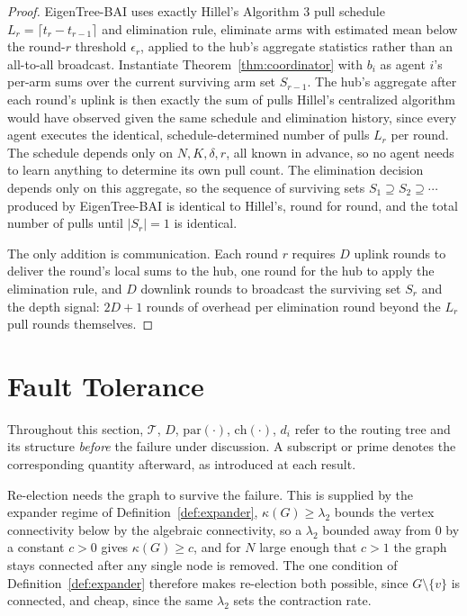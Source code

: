 \documentclass[letterpaper]{article} %
\begin{document}
\begin{proof}
EigenTree-BAI uses exactly Hillel's Algorithm 3 pull schedule $L_r = \lceil t_r
- t_{r-1}\rceil$ and elimination rule, eliminate arms with estimated mean
below the round-$r$ threshold $\epsilon_r$, applied to the hub's aggregate
statistics rather than an all-to-all broadcast. Instantiate
Theorem~\ref{thm:coordinator} with $b_i$ as agent $i$'s per-arm sums over
the current surviving arm set $S_{r-1}$. The hub's aggregate after each
round's uplink is then exactly the sum of pulls Hillel's centralized
algorithm would have observed given the same schedule and elimination
history, since every agent executes the identical, schedule-determined
number of pulls $L_r$ per round. The schedule depends only on
$N,K,\delta,r$, all known in advance, so no agent needs to learn anything
to determine its own pull count. The elimination decision depends only on
this aggregate, so the sequence of surviving sets $S_1 \supseteq S_2
\supseteq \cdots$ produced by EigenTree-BAI is identical to Hillel's, round for
round, and the total number of pulls until $|S_r|=1$ is identical.

The only addition is communication. Each round $r$ requires $D$ uplink
rounds to deliver the round's local sums to the hub, one round for the hub
to apply the elimination rule, and $D$ downlink rounds to broadcast the
surviving set $S_r$ and the depth signal: $2D+1$ rounds of overhead per
elimination round beyond the $L_r$ pull rounds themselves.
\end{proof}

\section{Fault Tolerance}
\label{sec:ft}

Throughout this section, $\mathcal{T}$, $D$, $\mathrm{par}(\cdot)$,
$\mathrm{ch}(\cdot)$, $d_i$ refer to the routing tree and its structure
\emph{before} the failure under discussion. A subscript or prime denotes
the corresponding quantity afterward, as introduced at each result.

Re-election needs the graph to survive the failure. This is supplied by the
expander regime of Definition~\ref{def:expander},
$\kappa(G)\geq\lambda_2$ \citep{fiedler1973} bounds the vertex connectivity
below by the algebraic connectivity, so a $\lambda_2$ bounded away from $0$ by a
constant $c>0$ gives $\kappa(G)\geq c$, and for $N$ large enough that $c>1$ the
graph stays connected after any single node is removed. The one condition of
Definition~\ref{def:expander} therefore makes re-election both possible, since
$G\setminus\{v\}$ is connected, and cheap, since the same $\lambda_2$ sets the
contraction rate.
\end{document}
